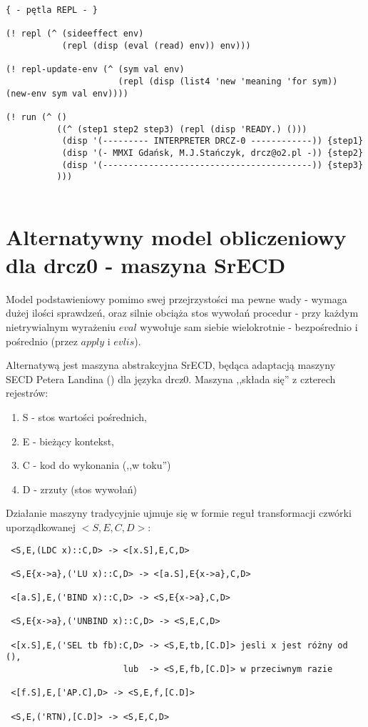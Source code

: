 \documentclass[a4paper]{article}
\begin{document}
\begin{verbatim}
{ - pętla REPL - }

(! repl (^ (sideeffect env)
           (repl (disp (eval (read) env)) env)))

(! repl-update-env (^ (sym val env)
                      (repl (disp (list4 'new 'meaning 'for sym)) (new-env sym val env))))

(! run (^ ()
          ((^ (step1 step2 step3) (repl (disp 'READY.) ()))
           (disp '(--------- INTERPRETER DRCZ-0 ------------)) {step1}
           (disp '(- MMXI Gdańsk, M.J.Stańczyk, drcz@o2.pl -)) {step2}
           (disp '(-----------------------------------------)) {step3}
          )))
	    
\end{verbatim}
\normalsize


\section{Alternatywny model obliczeniowy dla drcz0 - maszyna SrECD}

Model podstawieniowy pomimo swej przejrzystości ma pewne wady - wymaga dużej ilości sprawdzeń,
oraz silnie obciąża stos wywołań procedur - przy każdym nietrywialnym wyrażeniu $eval$ wywołuje
sam siebie wielokrotnie - bezpośrednio i pośrednio (przez $apply$ i $evlis$).

Alternatywą jest maszyna abstrakcyjna SrECD, będąca adaptacją maszyny SECD Petera Landina (\cite{MEE}) dla
języka drcz0. Maszyna ,,składa się'' z czterech rejestrów:
\begin{enumerate}
\item S - stos wartości pośrednich,
\item E - bieżący kontekst,
\item C - kod do wykonania (,,w toku'')
\item D - zrzuty (stos wywołań)
\end{enumerate}

Działanie maszyny tradycyjnie ujmuje się w formie reguł transformacji czwórki uporządkowanej $<S, E, C, D>$:
\begin{verbatim}
 <S,E,(LDC x)::C,D> -> <[x.S],E,C,D> 

 <S,E{x->a},('LU x)::C,D> -> <[a.S],E{x->a},C,D> 

 <[a.S],E,('BIND x)::C,D> -> <S,E{x->a},C,D> 

 <S,E{x->a},('UNBIND x)::C,D> -> <S,E,C,D> 

 <[x.S],E,('SEL tb fb):C,D> -> <S,E,tb,[C.D]> jesli x jest różny od (),
                       lub  -> <S,E,fb,[C.D]> w przeciwnym razie

 <[f.S],E,['AP.C],D> -> <S,E,f,[C.D]> 

 <S,E,('RTN),[C.D]> -> <S,E,C,D> 
\end{verbatim}
\end{document}
